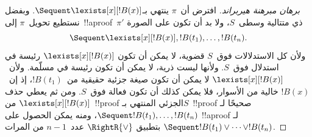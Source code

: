 \documentclass[../../../include/open-logic-section]{subfiles}
\begin{document}
\begin{proof}[برهان مبرهنة هيربراند]
افترض أن~$\pi$ ينتهي بـ$\Sequent \lexists[x][!B(x)]$. وبفضل
 نستطيع تحويل~$\pi$ إلى~!!a{proof}~$\pi'$ ذي
متتالية وسطى~$S$، ولا بد أن تكون على الصورة
\[
\Sequent \lexists[x][!B(x)], !B(t_1), \dots, !B(t_n).
\]
ولأن كل الاستدلالات فوق~$S$ قضوية، لا يمكن أن تكون
$\lexists[x][!B(x)]$ رئيسة في استدلال فوق~$S$. ولأنها ليست ذرية، لا
يمكن أن تكون رئيسة في مسلّمة. ولأن~$\lexists[x][!B(x)]$ لا يمكن أن تكون
صيغة جزئية حقيقية من~$!B(t_1)$، إذ إن~$!B(x)$ خالية من الأسوار، فلا
يمكن كذلك أن تكون فعالة فوق~$S$. ومن ثم يعطي حذف
$\lexists[x][!B(x)]$ من~!!{proof} الجزئي المنتهي بـ$S$~!!{proof}
صحيحًا لـ$\Sequent !B(t_1), \dots, !B(t_n)$، ومنه يمكن الحصول على
!!a{proof} لـ$\Sequent !B(t_1) \lor \dots \lor !B(t_n)$ بتطبيق
$\RightR{\lor}$ عدد~$n-1$ من المرات.
\end{proof}

\end{document}
